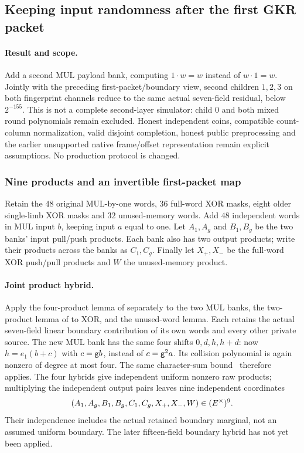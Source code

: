 \subsection{Keeping input randomness after the first GKR packet}\label{note:zk-even-children}

\paragraph{Result and scope.} Add a second MUL payload bank, computing $1\cdot w=w$ instead of $w\cdot1=w$. Jointly with the preceding first-packet/boundary view, second children $1,2,3$ on both fingerprint channels reduce to the same actual seven-field residual, below $2^{-155}$. This is not a complete second-layer simulator: child $0$ and both mixed round polynomials remain excluded. Honest independent coins, compatible count-column normalization, valid disjoint completion, honest public preprocessing and the earlier unsupported native frame/offset representation remain explicit assumptions. No production protocol is changed.

\subsubsection{Nine products and an invertible first-packet map}

Retain the $48$ original MUL-by-one words, $36$ full-word XOR masks, eight older single-limb XOR masks and $32$ unused-memory words. Add $48$ independent words in MUL input $b$, keeping input $a$ equal to one. Let $A_1,A_g$ and $B_1,B_g$ be the two banks' input pull/push products. Each bank also has two output products; write their products across the banks as $C_1,C_g$. Finally let $X_+,X_-$ be the full-word XOR push/pull products and $W$ the unused-memory product.

\paragraph{Joint product hybrid.} Apply the four-product lemma of  separately to the two MUL banks, the two-product lemma of  to XOR, and the unused-word lemma. Each retains the actual seven-field linear boundary contribution of its own words and every other private source. The new MUL bank has the same four shifts $0,d,h,h+d$: now $h=e_1(b+c)$ with $c=\mathsf{g} b$, instead of $c=\mathsf{g}^2a$. Its collision polynomial is again nonzero of degree at most four. The same character-sum bound~\cite{winger} therefore applies. The four hybrids give independent uniform nonzero raw products; multiplying the independent output pairs leaves nine independent coordinates
\[
 (A_1,A_g,B_1,B_g,C_1,C_g,X_+,X_-,W)\in(E^\times)^9.
\]
Their independence includes the actual retained boundary marginal, not an assumed uniform boundary. The later fifteen-field boundary hybrid has not yet been applied.

